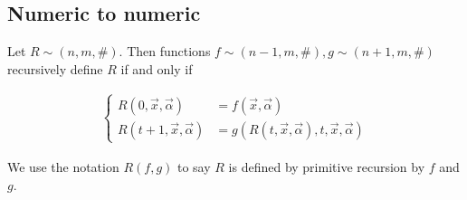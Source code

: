 \documentclass[a4paper, 12pt]{article}
\begin{document}
\subsection{Numeric to numeric}

Let $R \sim (n, m, \#)$. Then functions $f \sim (n - 1, m, \#), g \sim (n + 1,
m, \#)$ recursively define $R$ if and only if 

\begin{align*}
\begin{cases}
    R(0, \overrightarrow{x}, \overrightarrow{\alpha}) &= f(
        \overrightarrow{x}, \overrightarrow{\alpha}) \\
    R(t + 1, \overrightarrow{x}, \overrightarrow{\alpha}) &= g \left( R(t,
        \overrightarrow{x}, \overrightarrow{\alpha}), t, \overrightarrow{x},
    \overrightarrow{\alpha} \right)
\end{cases}
\end{align*}

We use the notation $R(f, g)$ to say $R$ is defined by primitive recursion by
$f$ and $g$.
\end{document}
